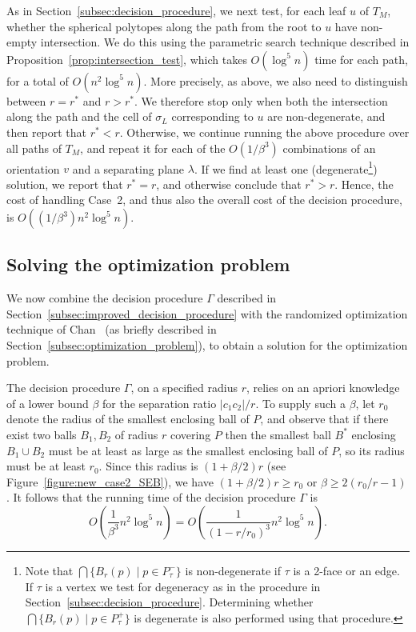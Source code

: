 \documentclass[a4paper,12pt]{article}
\begin{document}
As in Section~\ref{subsec:decision_procedure}, we next test, for
each leaf $u$ of $T_M$, whether the spherical polytopes along the
path from the root to $u$ have non-empty intersection. We do this
using the parametric search technique described in
Proposition~\ref{prop:intersection_test}, which takes $O(\log^5 n)$
time for each path, for a total of $O(n^2 \log^5 n)$. More
precisely, as above, we also need to distinguish between $r = r^*$
and $r > r^*$. We therefore stop only when both the intersection
along the path and the cell of $\sigma_L$ corresponding to $u$ are
non-degenerate, and then report that $r^* < r$. Otherwise, we
continue running the above procedure over all paths of $T_M$, and
repeat it for each of the $O(1/\beta^3)$ combinations of an
orientation $v$ and a separating plane $\lambda$. If we find at
least one (degenerate\footnote{Note that $\bigcap\{B_r(p) \mid p \in
P_\tau^-\}$ is non-degenerate if $\tau$ is a 2-face or an edge. If
$\tau$ is a vertex we test for degeneracy as in the procedure in
Section~\ref{subsec:decision_procedure}. Determining whether
$\bigcap\{B_r(p) \mid p \in P_\tau^+\}$ is degenerate is also
performed using that procedure.}) solution, we report that $r^* =
r$, and otherwise conclude that $r^*
> r$. Hence, the cost of handling Case~2, and thus also the overall
cost of the decision procedure, is $O((1/\beta^3) n^2 \log^5 n)$.

\subsection{Solving the optimization problem}
\label{sec:separated_centers_optimization}

We now combine the decision procedure $\Gamma$ described in Section~\ref{subsec:improved_decision_procedure} with the randomized optimization
technique of Chan~\cite{TCG} (as briefly described in Section~\ref{subsec:optimization_problem}),
to obtain a solution for the optimization problem.

The decision procedure $\Gamma$, on a specified radius $r$, relies on an apriori knowledge of a lower bound $\beta$ for the separation ratio
$|c_1c_2|/r$. To supply such a $\beta$, let $r_0$ denote the radius of the smallest
enclosing ball of $P$, and observe that if there exist two balls $B_1, B_2$ of radius $r$ covering $P$ then the smallest ball $B^*$ enclosing $B_1 \cup B_2$ must be at least as large as the smallest enclosing ball of $P$, so its radius must be at least $r_0$. Since this radius is
$(1+\beta/2)r$ (see Figure~\ref{figure:new_case2_SEB}), we have
$(1+ \beta/2)r \geq r_0$ or $\beta \geq 2(r_0/r -1)$.
It follows that the running time of the decision procedure $\Gamma$ is
$$O\left(\frac{1}{\beta^3} n^2 \log^5 n\right) =
O\left(\frac{1}{\left(1-r/r_0 \right)^3} n^2 \log^5 n\right).$$
\end{document}
